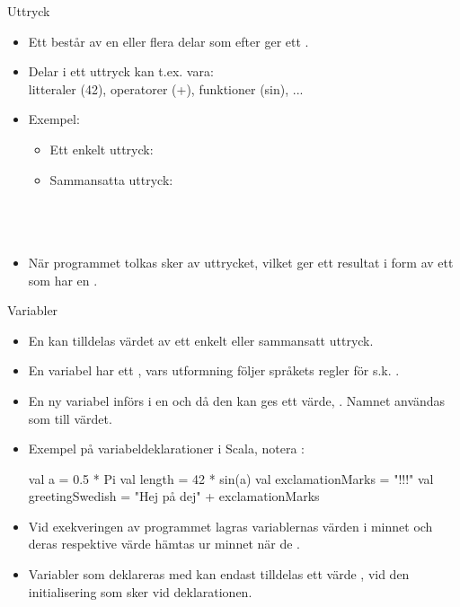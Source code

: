 \begin{Slide}{Uttryck}
\begin{itemize}
\item Ett  består av en eller flera delar som efter  ger ett .
\item Delar i ett uttryck kan t.ex. vara: \\ litteraler (42), operatorer (+), funktioner (sin), ...
\item Exempel:
\begin{itemize}
\item Ett enkelt uttryck: \\ 
\item Sammansatta uttryck: \\
 \\
 \\
 \\
\end{itemize}

\item När programmet tolkas sker  av uttrycket, vilket ger ett resultat i form av ett  som har en .
\end{itemize}
\end{Slide}


\begin{Slide}{Variabler}\SlideFontSmall
\begin{itemize}
\item En  kan tilldelas värdet av ett enkelt eller sammansatt uttryck.
\item En variabel har ett , vars utformning följer språkets regler för s.k. .
\item En ny variabel införs i en  och då den kan ges ett värde, . Namnet användas som  till värdet.
\item Exempel på variabeldeklarationer i Scala, notera  :
\begin{Code}
val a = 0.5 * Pi
val length = 42 * sin(a)
val exclamationMarks = "!!!"
val greetingSwedish = "Hej på dej" + exclamationMarks
\end{Code}

\item Vid exekveringen av programmet lagras variablernas värden i minnet och deras respektive värde hämtas ur minnet när de .

\item Variabler som deklareras med  kan endast tilldelas ett värde , vid den initialisering som sker vid deklarationen.
\end{itemize}

\end{Slide}


